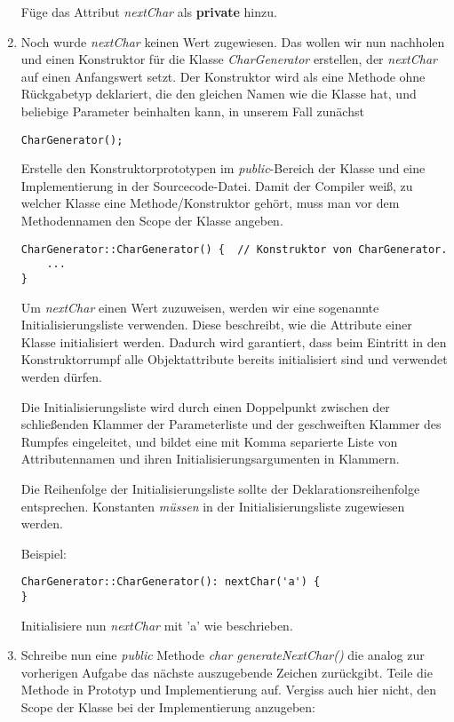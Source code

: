 \begin{enumerate}
Füge das Attribut \emph{nextChar} als \textbf{private} hinzu.

\item
Noch wurde \emph{nextChar} keinen Wert zugewiesen.
Das wollen wir nun nachholen und einen Konstruktor für die Klasse \emph{CharGenerator} erstellen, der \emph{nextChar} auf einen Anfangswert setzt.
Der Konstruktor wird als eine Methode ohne Rückgabetyp deklariert, die den gleichen Namen wie die Klasse hat, und beliebige Parameter beinhalten kann, in unserem Fall zunächst 
\begin{lstlisting}
CharGenerator();
\end{lstlisting}

Erstelle den Konstruktorprototypen im \emph{public}-Bereich der Klasse und eine Implementierung in der Sourcecode-Datei. Damit der Compiler weiß, zu welcher Klasse eine Methode/Konstruktor gehört, muss man vor dem Methodennamen den Scope der Klasse angeben.

\begin{lstlisting}
CharGenerator::CharGenerator() {  // Konstruktor von CharGenerator.
	...
}
\end{lstlisting}

Um \emph{nextChar} einen Wert zuzuweisen, werden wir eine sogenannte Initialisierungsliste verwenden.
Diese beschreibt, wie die Attribute einer Klasse initialisiert werden.
Dadurch wird garantiert, dass beim Eintritt in den Konstruktorrumpf alle Objektattribute bereits initialisiert sind und verwendet werden dürfen.

Die Initialisierungsliste wird durch einen Doppelpunkt zwischen der schließenden Klammer der Parameterliste und der geschweiften Klammer des Rumpfes eingeleitet, und bildet eine mit Komma separierte Liste von Attributennamen und ihren Initialisierungsargumenten in Klammern.

Die Reihenfolge der Initialisierungsliste sollte der Deklarationsreihenfolge entsprechen.
Konstanten \emph{müssen} in der Initialisierungsliste zugewiesen werden.

Beispiel:

\begin{lstlisting}
CharGenerator::CharGenerator(): nextChar('a') {
}
\end{lstlisting}

Initialisiere nun \emph{nextChar} mit 'a' wie beschrieben.

\item
Schreibe nun eine \emph{public} Methode \emph{char generateNextChar()} die analog zur vorherigen Aufgabe das nächste auszugebende Zeichen zurückgibt.
Teile die Methode in Prototyp und Implementierung auf.
Vergiss auch hier nicht, den Scope der Klasse bei der Implementierung anzugeben:


\end{enumerate}
